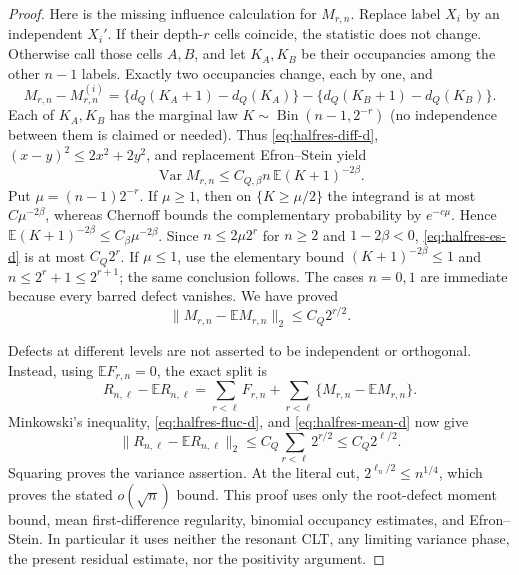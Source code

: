 \documentclass[11pt]{article}
\numberwithin{equation}{section}
\newcommand{\1}{\mathbf 1}\newcommand{\F}{\mathcal F}\newcommand{\D}{\mathcal D}
\begin{document}
\begin{proof}
Here is the missing influence calculation for $M_{r,n}$.  Replace label
$X_i$ by an independent $X_i'$.  If their depth-$r$ cells coincide, the
statistic does not change.  Otherwise call those cells $A,B$, and let
$K_A,K_B$ be their occupancies among the other $n-1$ labels.  Exactly two
occupancies change, each by one, and
\[
 M_{r,n}-M_{r,n}^{(i)}
 =\{d_Q(K_A+1)-d_Q(K_A)\}
  -\{d_Q(K_B+1)-d_Q(K_B)\}.
\]
Each of $K_A,K_B$ has the marginal law
$K\sim\operatorname {Bin}(n-1,2^{-r})$ (no independence between them is
claimed or needed).  Thus \eqref{eq:halfres-diff-d}, $(x-y)^2\le2x^2+2y^2$,
and replacement Efron--Stein yield
\begin{equation}
 \operatorname {Var}M_{r,n}
 \le C_{Q,\beta}n\,\mathbb E(K+1)^{-2\beta}.             \label{eq:halfres-es-d}
\end{equation}
Put $\mu=(n-1)2^{-r}$.  If $\mu\ge1$, then on
$\{K\ge\mu/2\}$ the integrand is at most $C\mu^{-2\beta}$,
whereas Chernoff bounds the complementary probability by $e^{-c\mu}$.
Hence $\mathbb E(K+1)^{-2\beta}\le C_\beta\mu^{-2\beta}$.
Since $n\le2\mu2^r$ for $n\ge2$ and $1-2\beta<0$,
\eqref{eq:halfres-es-d} is at most $C_Q2^r$.  If $\mu\le1$, use the
elementary bound $(K+1)^{-2\beta}\le1$ and
$n\le2^r+1\le2^{r+1}$; the same conclusion follows.  The cases $n=0,1$
are immediate because every barred defect vanishes.  We have proved
\begin{equation}
 \|M_{r,n}-\mathbb EM_{r,n}\|_2\le C_Q2^{r/2}.            \label{eq:halfres-mean-d}
\end{equation}

Defects at different levels are not asserted to be independent or
orthogonal.  Instead, using $\mathbb EF_{r,n}=0$, the exact split is
\[
 R_{n,\ell}-\mathbb ER_{n,\ell}
 =\sum_{r<\ell}F_{r,n}
   +\sum_{r<\ell}\{M_{r,n}-\mathbb EM_{r,n}\}.
\]
Minkowski's inequality, \eqref{eq:halfres-fluc-d}, and
\eqref{eq:halfres-mean-d} now give
\[
 \|R_{n,\ell}-\mathbb ER_{n,\ell}\|_2
 \le C_Q\sum_{r<\ell}2^{r/2}\le C_Q2^{\ell/2}.
\]
Squaring proves the variance assertion.  At the literal cut,
$2^{\ell_n/2}\le n^{1/4}$, which proves the stated $o(\sqrt n)$ bound.
This proof uses only the root-defect moment bound, mean first-difference
regularity, binomial occupancy estimates, and Efron--Stein.  In particular it
uses neither the resonant CLT, any limiting variance phase, the present
residual estimate, nor the positivity argument.
\end{proof}
\end{document}
